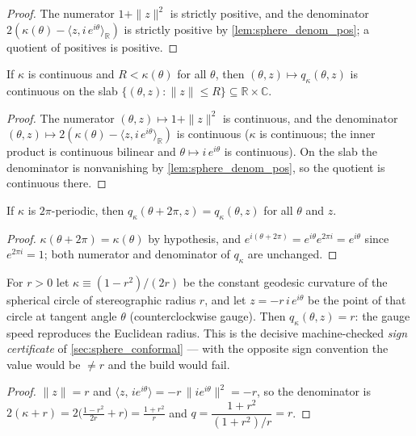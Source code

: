 \begin{proof}

\leanok
  The numerator $1+\|z\|^2$ is strictly positive, and the denominator
  $2(\kappa(\theta)-\langle z, i\,e^{i\theta}\rangle_{\mathbb R})$ is strictly positive by
  \cref{lem:sphere_denom_pos}; a quotient of positives is positive.
\end{proof}

\begin{lemma}
  \label{lem:spherical_speed_continuous}
  If $\kappa$ is continuous and $R<\kappa(\theta)$ for all $\theta$, then
  $(\theta,z)\mapsto q_\kappa(\theta,z)$ is continuous on the slab
  $\{(\theta,z):\|z\|\le R\}\subseteq\mathbb R\times\mathbb C$.
\end{lemma}

\begin{proof}

\leanok
  The numerator $(\theta,z)\mapsto 1+\|z\|^2$ is continuous, and the denominator
  $(\theta,z)\mapsto 2(\kappa(\theta)-\langle z, i\,e^{i\theta}\rangle_{\mathbb R})$ is
  continuous ($\kappa$ is continuous; the inner product is continuous bilinear and
  $\theta\mapsto i\,e^{i\theta}$ is continuous). On the slab the denominator is nonvanishing
  by \cref{lem:sphere_denom_pos}, so the quotient is continuous there.
\end{proof}

\begin{lemma}
  \label{lem:spherical_speed_periodic}
  If $\kappa$ is $2\pi$-periodic, then $q_\kappa(\theta+2\pi,z)=q_\kappa(\theta,z)$ for all
  $\theta$ and $z$.
\end{lemma}

\begin{proof}

\leanok
  $\kappa(\theta+2\pi)=\kappa(\theta)$ by hypothesis, and
  $e^{i(\theta+2\pi)}=e^{i\theta}e^{2\pi i}=e^{i\theta}$ since $e^{2\pi i}=1$; both
  numerator and denominator of $q_\kappa$ are unchanged.
\end{proof}

\begin{lemma}

  \label{lem:spherical_speed_circle}
  For $r>0$ let $\kappa\equiv(1-r^2)/(2r)$ be the constant geodesic curvature of the
  spherical circle of stereographic radius $r$, and let $z=-r\,i\,e^{i\theta}$ be the point
  of that circle at tangent angle $\theta$ (counterclockwise gauge). Then
  $q_\kappa(\theta,z)=r$: the gauge speed reproduces the Euclidean radius. This is the
  decisive machine-checked \emph{sign certificate} of \cref{sec:sphere_conformal} — with
  the opposite sign convention the value would be $\ne r$ and the build would fail.
\end{lemma}

\begin{proof}

\leanok
  $\|z\|=r$ and $\langle z,\,i e^{i\theta}\rangle=-r\,\|i e^{i\theta}\|^2=-r$, so the
  denominator is $2(\kappa+r)=2\bigl(\tfrac{1-r^2}{2r}+r\bigr)=\tfrac{1+r^2}{r}$ and
  $q=\dfrac{1+r^2}{(1+r^2)/r}=r$.
\end{proof}
